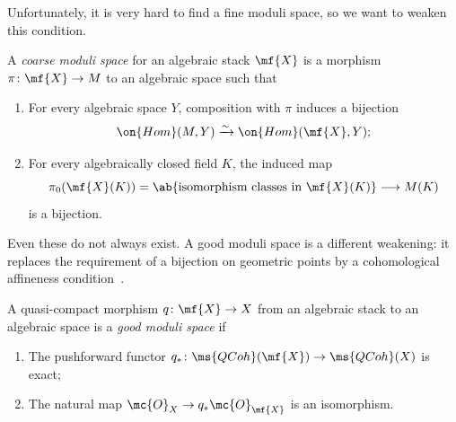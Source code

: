 Unfortunately, it is very hard to find a fine moduli space, so we want to weaken this condition.

\begin{defn}
    A \textit{coarse moduli space} for an algebraic stack \(\mf{X}\) is a morphism \(\pi\colon\mf{X}\to M\) to an algebraic space such that
    \begin{enumerate}
        \item For every algebraic space \(Y\), composition with \(\pi\) induces a bijection
        \[
            \on{Hom}(M,Y)\xrightarrow{\sim}\on{Hom}(\mf{X},Y);
        \]
        \item For every algebraically closed field \(K\), the induced map
        \[
            \pi_0(\mf{X}(K))=\ab\{\text{isomorphism classes in }\mf{X}(K)\}
            \longrightarrow M(K)
        \]
        is a bijection.
    \end{enumerate}
\end{defn}


Even these do not always exist. A good moduli space is a different weakening: it replaces the requirement of a bijection on geometric points by a cohomological affineness condition~\cite{Alper2013}.

\begin{defn}
    A quasi-compact morphism \(q\colon\mf{X}\to X\) from an algebraic stack to an algebraic space is a \textit{good moduli space} if
    \begin{enumerate}
        \item The pushforward functor \(q_*\colon\ms{QCoh}(\mf{X})\to\ms{QCoh}(X)\) is exact;
        \item The natural map \(\mc{O}_X\to q_*\mc{O}_{\mf{X}}\) is an isomorphism.
    \end{enumerate}
\end{defn}

